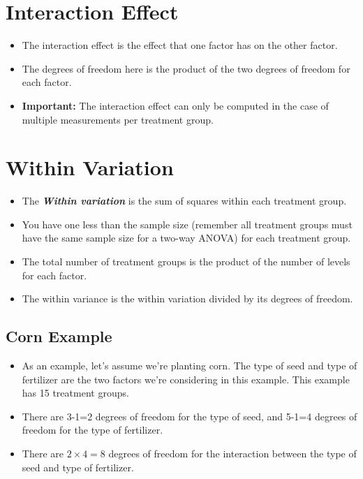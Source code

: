 \documentclass[]{article}
\begin{document}
\section{Interaction Effect}
\begin{itemize}
\item The interaction effect is the effect that one factor has on the other factor. 
\item The degrees of freedom here is the product of the two degrees of freedom for each factor. 
\item \textbf{Important:} The interaction effect can only be computed in the case of multiple measurements per treatment group.
\end{itemize}


\section{Within Variation}
\begin{itemize}
	\item The \textbf{\textit{Within variation}} is the sum of squares within each treatment group. 
	\item You have one less than the sample size (remember all treatment groups must have the same sample size for a two-way ANOVA) for each treatment group. 
	\item The total number of treatment groups is the product of the number of levels for each factor. 
	\item The within variance is the within variation divided by its degrees of freedom.
\end{itemize}




\subsection{Corn Example}
\begin{itemize}
\item As an example, let's assume we're planting corn. The type of seed and type of fertilizer are the two factors we're considering in this example. This example has 15 treatment groups. 
\item There are 3-1=2 degrees of freedom for the type of seed, and 5-1=4 degrees of freedom for the type of fertilizer. 
\item There are $2\times4 = 8$ degrees of freedom for the interaction between the type of seed and type of fertilizer.
\end{itemize}
\end{document}

